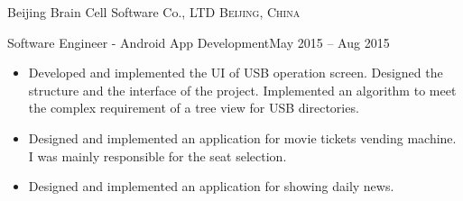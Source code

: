 \documentclass[10pt,a4paper]{article}
\begin{document}
\vspace{0.2em}
  \headedsection
  {Beijing Brain Cell Software Co., LTD}
  {\textsc{Beijing, China}}
  {
    \headedsubsection
    {Software Engineer - Android App Development}{May 2015 -- Aug 2015}
    {\vspace{0.1em}
      \begin{itemize}
        \setlength{\itemsep}{0.3em}
      \item Developed and implemented the UI of USB operation screen. Designed the structure and the interface of the project. Implemented an algorithm to meet the complex requirement of a tree view for USB directories.
       
      \item Designed and implemented an application for movie tickets vending machine. I was mainly responsible for the seat selection.
       
      \item Designed and implemented an application for showing daily news.
        
        
        
        
        
        
      \end{itemize}
    }
  }
\end{document}
